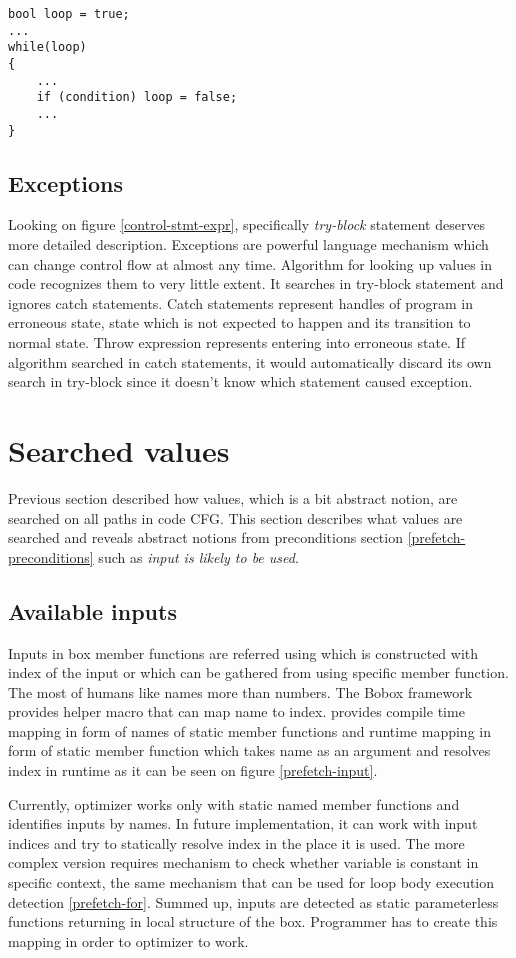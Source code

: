 \begin{lstlisting}
bool loop = true;
...
while(loop)
{
    ...
    if (condition) loop = false;
    ...
}
\end{lstlisting}

\subsection{Exceptions}
Looking on figure \ref{control-stmt-expr}, specifically \emph{try-block} statement deserves more detailed description. Exceptions are powerful language mechanism which can change control flow at almost any time. Algorithm for looking up values in code recognizes them to very little extent. It searches in try-block statement and ignores catch statements. Catch statements represent handles of program in erroneous state, state which is not expected to happen and its transition to normal state. Throw expression represents entering into erroneous state. If algorithm searched in catch statements, it would automatically discard its own search in try-block since it doesn't know which statement caused exception.

\section{Searched values}
Previous section described how values, which is a bit abstract notion, are searched on all paths in code CFG. This section describes what values are searched and reveals abstract notions from preconditions section \ref{prefetch-preconditions} such as \textit{input is likely to be used}.

\subsection{Available inputs}
Inputs in box member functions are referred using  which is constructed with index of the input or  which can be gathered from  using specific  member function. The most of humans like names more than numbers. The Bobox framework provides helper macro that can map name to index.  provides compile time mapping in form of names of static member functions and runtime mapping in form of static member function which takes name as an argument and resolves index in runtime as it can be seen on figure \ref{prefetch-input}.

Currently, optimizer works only with static named member functions and identifies inputs by names. In future implementation, it can work with input indices and try to statically resolve index in the place it is used. The more complex version requires mechanism to check whether variable is constant in specific context, the same mechanism that can be used for loop body execution detection \ref{prefetch-for}. Summed up, inputs are detected as static parameterless functions returning  in local  structure of the box. Programmer has to create this mapping in order to optimizer to work.

